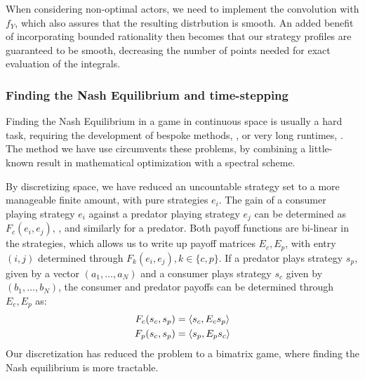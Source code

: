 When considering non-optimal actors, we need to implement the convolution with $f_Y$, which also assures that the resulting distrbution is smooth. An added benefit of incorporating bounded rationality then becomes that our strategy profiles are guaranteed to be smooth, decreasing the number of points needed for exact evaluation of the integrals.


\subsubsection*{Finding the Nash Equilibrium and time-stepping}
Finding the Nash Equilibrium in a game in continuous space is usually a hard task, requiring the development of bespoke methods, \citep{verticalmigration}, or very long runtimes, \citep{jerome}. The method we have use circumvents these problems, by combining a little-known result in mathematical optimization with a spectral scheme.

By discretizing space, we have reduced an uncountable strategy set to a more manageable finite amount, with pure strategies $e_i$. The gain of a consumer playing strategy $e_i$ against a predator playing strategy $e_j$ can be determined as $F_c(e_i,e_j)$, , and similarly for a predator. Both payoff functions are bi-linear in the strategies, which allows us to write up payoff matrices $E_c, E_p$, with entry $(i,j)$ determined through $F_k(e_i,e_j), k \in \{c, p\}$. If a predator plays strategy $s_p$, given by a vector $(a_1,\dots,a_N)$ and a consumer plays strategy $s_c$ given by $(b_1,\dots,b_N)$, the consumer and predator payoffs can be determined through $E_c,E_p$ as:
\begin{align*}
  F_c(s_c,s_p)&=\left \langle s_c,E_c s_p \right \rangle \\
  F_p(s_c,s_p)&=\left \langle s_p,E_p s_c \right \rangle
\end{align*}
Our discretization has reduced the problem to a bimatrix game, where finding the Nash equilibrium is more tractable.


